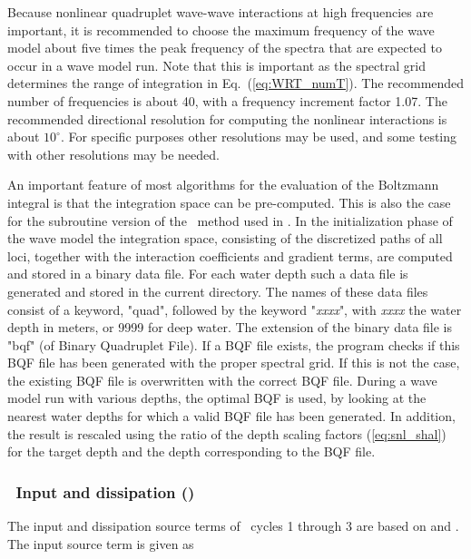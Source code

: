 Because nonlinear quadruplet wave-wave interactions at high frequencies are
important, it is recommended to choose the maximum frequency of the wave model
about five times the peak frequency of the spectra that are expected to occur
in a wave model run. Note that this is important as the spectral grid
determines the range of integration in Eq.~(\ref{eq:WRT_numT}). The
recommended number of frequencies is about 40, with a frequency increment
factor 1.07. The recommended directional resolution for computing the
nonlinear interactions is about $10^\circ$. For specific purposes other
resolutions may be used, and some testing with other resolutions may be
needed.

An important feature of most algorithms for the evaluation of the Boltzmann
integral is that the integration space can be pre-computed.  This is also the
case for the subroutine version of the \xnl\ method used in \ws. In the
initialization phase of the wave model the integration space, consisting of
the discretized paths of all loci, together with the interaction coefficients
and gradient terms, are computed and stored in a binary data file. For each
water depth such a data file is generated and stored in the current
directory. The names of these data files consist of a keyword, "quad",
followed by the keyword "{\it{xxxx}}", with {\it xxxx} the water depth in
meters, or 9999 for deep water.  The extension of the binary data file is
"bqf" (of Binary Quadruplet File). If a BQF file exists, the program checks if
this BQF file has been generated with the proper spectral grid. If this is not
the case, the existing BQF file is overwritten with the correct BQF
file. During a wave model run with various depths, the optimal BQF is used, by
looking at the nearest water depths for which a valid BQF file has been
generated. In addition, the result is rescaled using the ratio of the depth
scaling factors (\ref{eq:snl_shal}) for the target depth and the depth
corresponding to the BQF file.


\vsssub
\subsubsection{~Input and dissipation ()} \label{sec:wam}
\vsssub

The input and dissipation source terms of \wam\ cycles 1 through 3 are based
on \cite{art:Sea81} and \cite{art:KHH84} \citep[see also][]{art:WAM88}. The
input source term is given as

